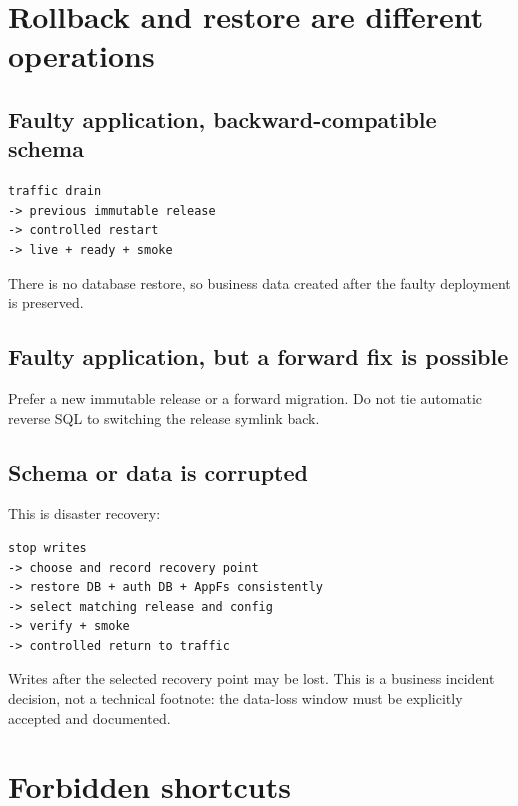 \section{Rollback and restore are different operations}

\subsection*{Faulty application, backward-compatible schema}

\begin{lstlisting}
traffic drain
-> previous immutable release
-> controlled restart
-> live + ready + smoke
\end{lstlisting}

There is no database restore, so business data created after the faulty deployment is preserved.

\subsection*{Faulty application, but a forward fix is possible}

Prefer a new immutable release or a forward migration. Do not tie automatic reverse SQL to switching the release symlink back.

\subsection*{Schema or data is corrupted}

This is disaster recovery:

\begin{lstlisting}
stop writes
-> choose and record recovery point
-> restore DB + auth DB + AppFs consistently
-> select matching release and config
-> verify + smoke
-> controlled return to traffic
\end{lstlisting}

Writes after the selected recovery point may be lost. This is a business incident decision, not a technical footnote: the data-loss window must be explicitly accepted and documented.

\section{Forbidden shortcuts}

